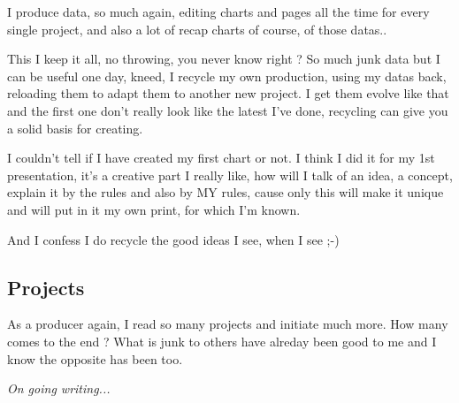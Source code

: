 I produce data, so much again, editing charts and pages all the time for
every single project, and also a lot of recap charts of course, of
those datas..

This I keep it all, no throwing, you never know right ? So much junk
data but I can be useful one day, kneed, I recycle my own production,
using my datas back, reloading them to adapt them to another new
project. I get them evolve like that and the first one
don{\textquoteright}t really look like the latest I{\textquoteright}ve
done, recycling can give you a solid basis for creating.~

I couldn{\textquoteright}t tell if I have created my first chart or not.
I think I did it for my 1st presentation, it{\textquoteright}s a
creative part I really like, how will I talk of an idea, a concept,
explain it by the rules and also by MY rules, cause only this will make
it unique and will put in it my own print, for which
I{\textquoteright}m known.

And I confess I do recycle the good ideas I see, when I see ;-)

\subsection{Projects}
As a producer again, I read so many projects and initiate much more. How
many comes to the end ? What is junk to others have alreday been good
to me and I know the opposite has been too.

\textit{On going writing...}
